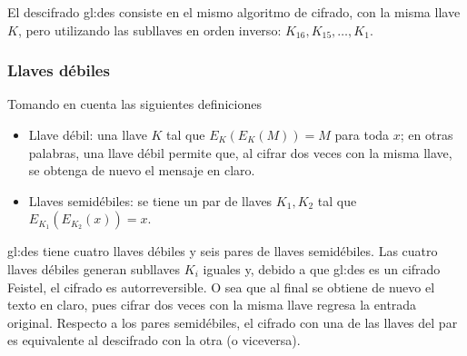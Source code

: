 El descifrado \acrshort{gl:des} consiste en el mismo algoritmo de cifrado,
con la misma llave $K$, pero utilizando las subllaves en orden inverso:
$K_{16}, K_{15}, \dots, K_1$.

\subsubsection{Llaves débiles}
Tomando en cuenta las siguientes definiciones

\begin{itemize}
  \item Llave débil: una llave $K$ tal que $E_K(E_K(M)) = M$ para toda
    $x$; en otras palabras, una llave débil permite que, al cifrar dos
    veces con la misma llave, se obtenga de nuevo el mensaje en claro.
  \item Llaves semidébiles: se tiene un par de llaves $K_1, K_2$ tal que
    $E_{K_1}(E_{K_2}(x)) = x$.
\end{itemize}

\acrshort{gl:des} tiene cuatro llaves débiles y seis pares de llaves
semidébiles. Las cuatro llaves débiles generan subllaves $K_i$ iguales y,
debido a que \acrshort{gl:des} es un cifrado Feistel, el cifrado es
autorreversible. O sea que al final se obtiene de nuevo el texto en claro,
pues cifrar dos veces con la misma llave regresa la entrada original.
Respecto a los pares semidébiles, el cifrado con una de las llaves del
par es equivalente al descifrado  con la otra (o viceversa).
